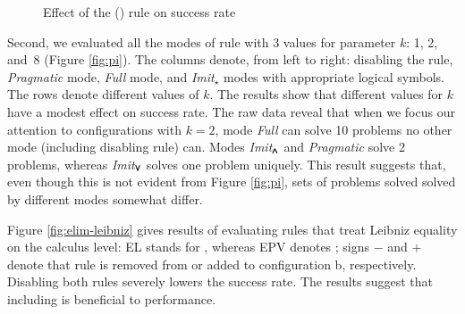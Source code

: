 
\begin{figure}[t]
  \begin{center}
    \def\arraystretch{1.1}%
    \caption{Effect of the () rule on success rate }
    \label{fig:cases}
  \end{center}
\end{figure}

Second, we evaluated all the modes of  rule with 3 values for
parameter $k$: 1, 2, and~8 (Figure \ref{fig:pi}). The columns denote, from left to
right: disabling the  rule, \emph{Pragmatic} mode, \emph{Full} mode,
and \emph{Imit}$_\star$ modes with appropriate logical symbols. The rows denote
different values of $k$. The results show that different values for $k$ have a
modest effect on success rate. The raw data reveal that when we focus our
attention to configurations with $k=2$, mode \emph{Full} can solve 10 problems
no other mode (including disabling  rule) can. Modes
\emph{Imit}$_{\pmb{\land}}$ and \emph{Pragmatic} solve 2  problems, whereas
\emph{Imit}$_{\pmb{\lor}}$ solves one problem uniquely. This result suggests that, even
though this is not evident from Figure \ref{fig:pi}, sets of problems solved 
solved by different modes somewhat differ.

Figure \ref{fig:elim-leibniz} gives results of evaluating rules that treat
Leibniz equality on the calculus level: EL stands for ,
whereas EPV denotes ; signs $-$ and $+$ denote that rule is
removed from or added to configuration b, respectively. Disabling both rules
severely lowers the success rate. The results suggest that including
 is beneficial to performance.

